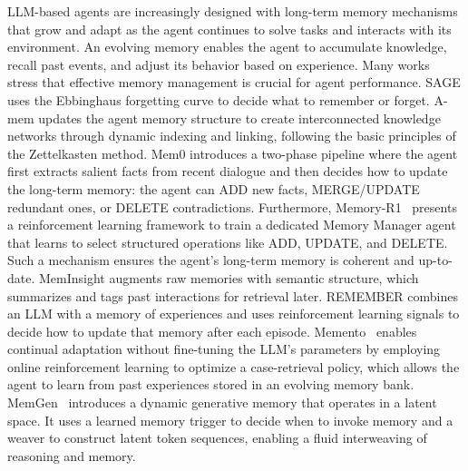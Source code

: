 \documentclass[10pt]{article} %
\begin{document}
LLM-based agents are increasingly designed with long-term memory mechanisms that grow and adapt as the agent continues to solve tasks and interacts with its environment\citep{shan2025cognitive, qian2023experiential}. An evolving memory enables the agent to accumulate knowledge, recall past events, and adjust its behavior based on experience. Many works stress that effective memory management is crucial for agent performance\citep{zhong2024memorybank, zhang2025g, yan2024efficient}. SAGE\citep{liang2024sage} uses the Ebbinghaus forgetting curve to decide what to remember or forget. A-mem\citep{xu2025mem} updates the agent memory structure to create interconnected knowledge networks through dynamic indexing and linking, following the basic principles of the Zettelkasten method. Mem0\citep{chhikara2025mem0} introduces a two-phase pipeline where the agent first extracts salient facts from recent dialogue and then decides how to update the long-term memory: the agent can ADD new facts, MERGE/UPDATE redundant ones, or DELETE contradictions. Furthermore, Memory-R1~\citep{yan2025memoryr1} presents a reinforcement learning framework to train a dedicated Memory Manager agent that learns to select structured operations like ADD, UPDATE, and DELETE.
Such a mechanism ensures the agent's long-term memory is coherent and up-to-date. MemInsight\citep{salama2025meminsight} augments raw memories with semantic structure, which summarizes and tags past interactions for retrieval later. REMEMBER\citep{zhang2024large} combines an LLM with a memory of experiences and uses reinforcement learning signals to decide how to update that memory after each episode. 
Memento~\citep{zhou2025memento} enables continual adaptation without fine-tuning the LLM's parameters by employing online reinforcement learning to optimize a case-retrieval policy, which allows the agent to learn from past experiences stored in an evolving memory bank. MemGen~\citep{zhang2025memgen} introduces a dynamic generative memory that operates in a latent space. It uses a learned memory trigger to decide when to invoke memory and a weaver to construct latent token sequences, enabling a fluid interweaving of reasoning and memory.
\end{document}
